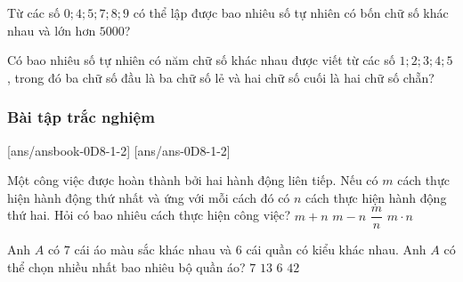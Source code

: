 \begin{bt}%
	Từ các số $0;4;5;7;8;9$ có thể lập được bao nhiêu số tự nhiên có bốn chữ số khác nhau và lớn hơn $5000$?
\end{bt}

\begin{bt}%
	Có bao nhiêu số tự nhiên có năm chữ số khác nhau được viết từ các số $1;2;3;4;5$, trong đó ba chữ số đầu là ba chữ số lẻ và hai chữ số cuối là hai chữ số chẵn?
\end{bt}

\subsubsection{Bài tập trắc nghiệm}
[ans/ansbook-0D8-1-2]
[ans/ans-0D8-1-2]
\setcounter{ex}{0}
\begin{ex}%
	Một công việc được hoàn thành bởi hai hành động liên tiếp. Nếu có $ m $ cách thực hiện hành động thứ nhất và ứng với mỗi cách đó có $ n $ cách thực hiện hành động thứ hai. Hỏi có bao nhiêu cách thực hiện công việc?
	\choice
	{$ m+n $}
	{$ m-n $}
	{$ \dfrac{m}{n}$}
	{\True $ m\cdot n $}
\end{ex}

\begin{ex}%
	Anh $A$ có $7$ cái áo màu sắc khác nhau và $6$ cái quần có kiểu khác nhau. Anh $A$ có thể chọn nhiều nhất bao nhiêu bộ quần áo?
	\choice
	{$7$}
	{$13$}
	{$6$}
	{\True $42$}
\end{ex}

